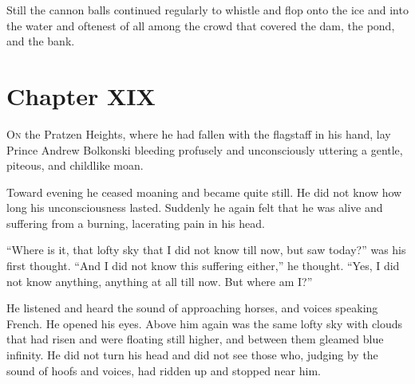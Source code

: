 Still the cannon balls continued regularly to whistle and flop
onto the ice and into the water and oftenest of all among the
crowd that covered the dam, the pond, and the bank.


\chapter*{Chapter XIX}
\ifaudio     
{} 
\fi

\lettrine[lines=2, loversize=0.3, lraise=0]{\initfamily O}{n}
the Pratzen Heights, where he had fallen with the flagstaff in
his hand, lay Prince Andrew Bolkonski bleeding profusely and
unconsciously uttering a gentle, piteous, and childlike moan.

Toward evening he ceased moaning and became quite still. He did
not know how long his unconsciousness lasted. Suddenly he again
felt that he was alive and suffering from a burning, lacerating
pain in his head.

``Where is it, that lofty sky that I did not know till now, but
saw today?'' was his first thought. ``And I did not know this
suffering either,'' he thought. ``Yes, I did not know anything,
anything at all till now. But where am I?''

He listened and heard the sound of approaching horses, and voices
speaking French. He opened his eyes. Above him again was the same
lofty sky with clouds that had risen and were floating still
higher, and between them gleamed blue infinity. He did not turn
his head and did not see those who, judging by the sound of hoofs
and voices, had ridden up and stopped near him.

